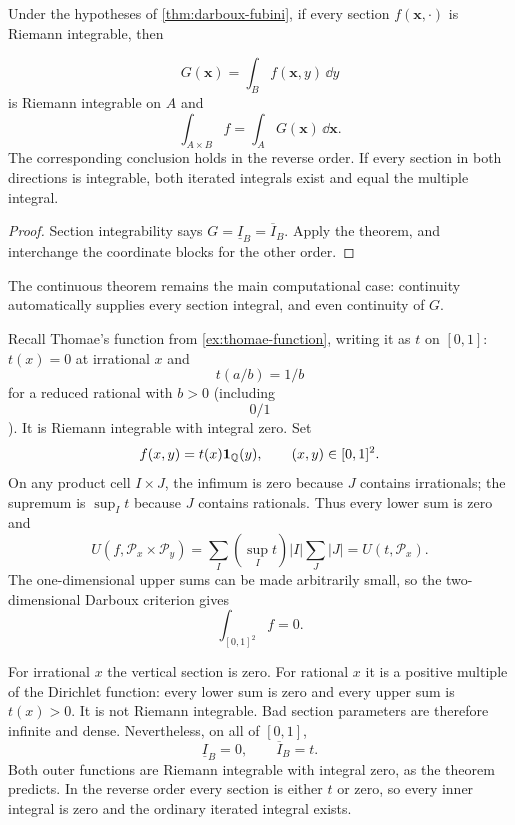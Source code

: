 \begin{corollary}
\label{cor:ordinary-iterated-riemann}
Under the hypotheses of \cref{thm:darboux-fubini}, if every section
$f(\mathbf{x},\cdot)$ is Riemann integrable, then

\[
G(\mathbf{x})=\int_Bf(\mathbf{x},y)\,\dd y
\]
 is Riemann integrable on $A$ and
\[
\int_{A\times B}f=\int_A G(\mathbf{x})\,\dd\mathbf{x}.
\]
The corresponding conclusion holds in the reverse order. If every section
in both directions is integrable, both iterated integrals exist and equal
the multiple integral.
\end{corollary}
\begin{proof}
Section integrability says $G=\underline I_B=\overline I_B$.
Apply the theorem, and interchange the coordinate blocks for the other order.
\end{proof}
The continuous theorem remains the main computational case: continuity
automatically supplies every section integral, and even continuity of $G$.

\begin{example}
\label{ex:thomae-dirichlet-sections}
Recall Thomae's function from \cref{ex:thomae-function}, writing it as
$t$ on $[0,1]$: $t(x)=0$ at irrational
$x$ and
\[
t(a/b)=1/b
\]
 for a reduced rational with $b>0$ (including
\[
0/1
\]
).
It is Riemann integrable with integral zero. Set
\[
f(x,y)=t(x)\mathbf1_{\mathbb{Q}}(y),\qquad (x,y)\in[0,1]^2.
\]
On any product cell $I\times J$, the infimum is zero because $J$
contains irrationals; the supremum is $\sup_I t$ because $J$ contains
rationals. Thus every lower sum is zero and
\[
U(f,\mathcal P_x\times\mathcal P_y)
=\sum_I(\sup_I t)|I|\sum_J|J|=U(t,\mathcal P_x).
\]
The one-dimensional upper sums can be made arbitrarily small, so the
two-dimensional Darboux criterion gives
\[
\int_{[0,1]^2}f=0.
\]

For irrational $x$ the vertical section is zero. For rational $x$ it is
a positive multiple of the Dirichlet function: every lower sum is zero
and every upper sum is $t(x)>0$. It is not Riemann integrable.
Bad section parameters are therefore infinite and dense.
Nevertheless, on all of $[0,1]$,
\[
\underline I_B=0,\qquad \overline I_B=t.
\]
Both outer functions are Riemann integrable with integral zero, as the
theorem predicts. In the reverse order every section is either $t$ or
zero, so every inner integral is zero and the ordinary iterated integral exists.
\end{example}

